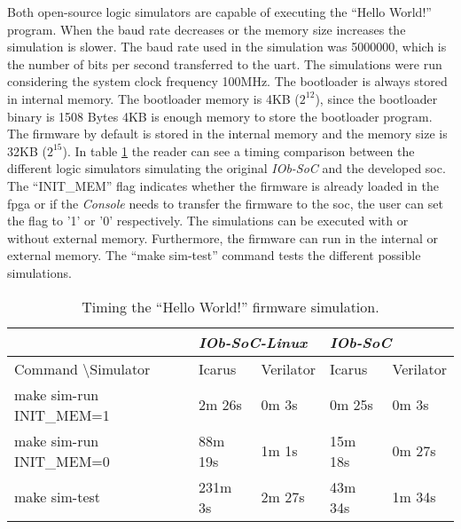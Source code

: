 Both open-source logic simulators are capable of executing the \enquote{Hello World!} program. When the baud rate decreases or the memory size increases the simulation is slower. The baud rate used in the simulation was 5000000, which is the number of bits per second transferred to the \acrshort{uart}. The simulations were run considering the system clock frequency 100MHz. The bootloader is always stored in internal memory. The bootloader memory is 4KB ($2^12$), since the bootloader binary is 1508 Bytes 4KB is enough memory to store the bootloader program. The firmware by default is stored in the internal memory and the memory size is 32KB ($2^15$). In table \ref{tab:hello_sim} the reader can see a timing comparison between the different logic simulators simulating the original \textit{IOb-SoC} and the developed \acrshort{soc}. The \enquote{INIT\_MEM} flag indicates whether the firmware is already loaded in the \acrshort{fpga} or if the \textit{Console} needs to transfer the firmware to the \acrshort{soc}, the user can set the flag to '1' or '0' respectively. The simulations can be executed with or without external memory. Furthermore, the firmware can run in the internal or external memory. The \enquote{make sim-test} command tests the different possible simulations.

\begin{table}[!ht]
    \centering
    \begin{tabular}{l|ll|ll|}
    \cline{2-5}
                                                           & \multicolumn{2}{l|}{\textit{IOb-SoC-Linux}} & \multicolumn{2}{l|}{\textit{IOb-SoC}}    \\ \hline
    \multicolumn{1}{|l|}{Command \textbackslash Simulator} & \multicolumn{1}{l|}{Icarus}  & Verilator & \multicolumn{1}{l|}{Icarus}  & Verilator \\ \hline
    \multicolumn{1}{|l|}{make sim-run INIT\_MEM=1}              & \multicolumn{1}{l|}{2m 26s}  & 0m 3s     & \multicolumn{1}{l|}{0m 25s}  & 0m 3s     \\ \hline
    \multicolumn{1}{|l|}{make sim-run INIT\_MEM=0}              & \multicolumn{1}{l|}{88m 19s} & 1m 1s     & \multicolumn{1}{l|}{15m 18s} & 0m 27s    \\ \hline
    \multicolumn{1}{|l|}{make sim-test}                         & \multicolumn{1}{l|}{231m 3s} & 2m 27s    & \multicolumn{1}{l|}{43m 34s} & 1m 34s    \\ \hline
    \end{tabular}
    \caption{Timing the \enquote{Hello World!} firmware simulation.}
    \label{tab:hello_sim}
\end{table}

